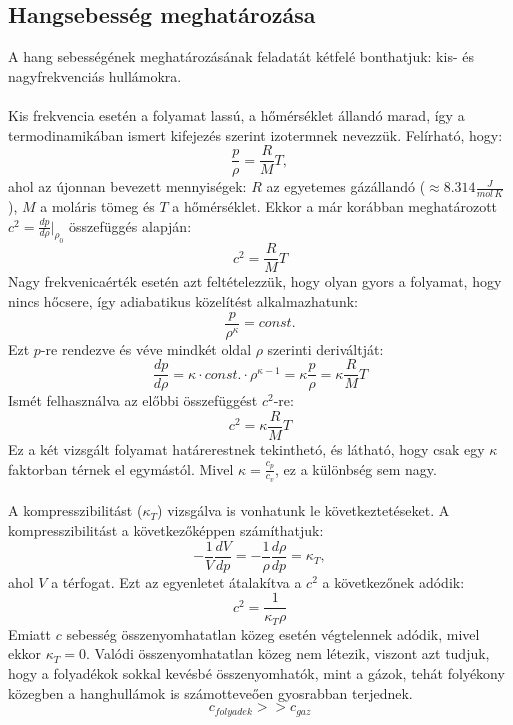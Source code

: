 \documentclass[a4paper, titlepage]{article}
\begin{document}
\subsection*{Hangsebesség meghatározása}
A hang sebességének meghatározásának feladatát kétfelé bonthatjuk: kis- és nagyfrekvenciás hullámokra.\\\\
Kis frekvencia esetén a folyamat lassú, a hőmérséklet állandó marad, így a termodinamikában ismert kifejezés szerint izotermnek nevezzük. Felírható, hogy:
\begin{equation}
\frac{p}{\rho}=\frac{R}{M}T,
\end{equation}
ahol az újonnan bevezett mennyiségek: $R$ az egyetemes gázállandó ($\approx 8.314 \frac{J}{mol\,K}$), $M$ a moláris tömeg és $T$ a hőmérséklet. Ekkor a már korábban meghatározott $c^2=\frac{dp}{d\rho}\big\vert_{\rho_0}$ összefüggés alapján:
\begin{equation}
c^2=\frac{R}{M}T
\end{equation}
Nagy frekvenicaérték esetén azt feltételezzük, hogy olyan gyors a folyamat, hogy nincs hőcsere, így adiabatikus közelítést alkalmazhatunk:
\begin{equation}
\frac{p}{\rho^\kappa}=const.
\end{equation}
Ezt $p$-re rendezve és véve mindkét oldal $\rho$ szerinti deriváltját:
$$
\frac{dp}{d\rho}=\kappa\cdot const.\cdot \rho^{\kappa-1}=\kappa\frac{p}{\rho}=\kappa\frac{R}{M}T
$$
Ismét felhasználva az előbbi összefüggést $c^2$-re:
\begin{equation}
c^2=\kappa\frac{R}{M}T
\end{equation}
Ez a két vizsgált folyamat határerestnek tekinthetó, és látható, hogy csak egy $\kappa$ faktorban térnek el egymástól. Mivel $\kappa=\frac{c_p}{c_v}$, ez a különbség sem nagy.\\\\
A kompresszibilitást ($\kappa_T$) vizsgálva is vonhatunk le következtetéseket. A kompresszibilitást a következőképpen számíthatjuk:
\begin{equation}
-\frac{1}{V}\frac{dV}{dp}=-\frac{1}{\rho}\frac{d\rho}{dp}=\kappa_T,
\end{equation}
ahol $V$ a térfogat. Ezt az egyenletet átalakítva a $c^2$ a következőnek adódik:
\begin{equation}
c^2=\frac{1}{\kappa_T \rho}
\end{equation}
Emiatt $c$ sebesség összenyomhatatlan közeg esetén végtelennek adódik, mivel ekkor $\kappa_T=0$. Valódi összenyomhatatlan közeg nem létezik, viszont azt tudjuk, hogy a folyadékok sokkal kevésbé összenyomhatók, mint a gázok, tehát folyékony közegben a hanghullámok is számotteveően gyosrabban terjednek.
$$
c_{folyadek}>>c_{gaz}
$$
\end{document}
